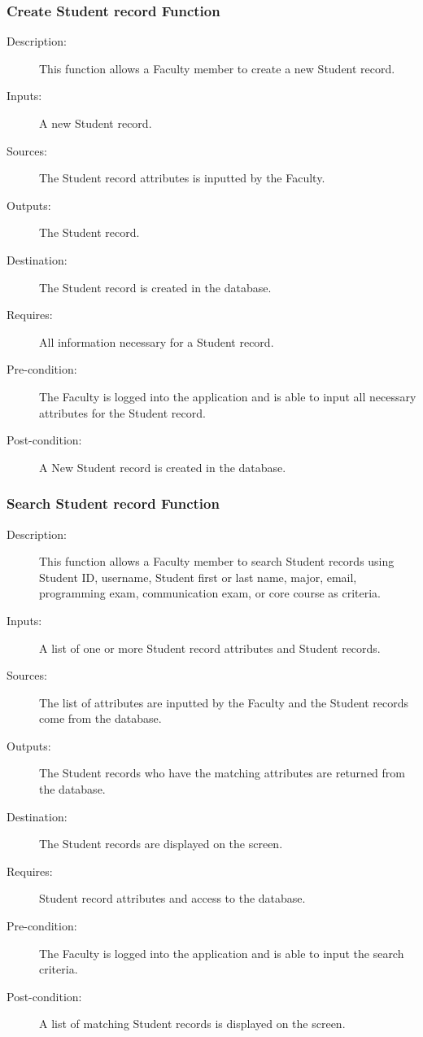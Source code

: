 \subsubsection{\large Create Student record Function} 
\begin{boxed} %
\small\begin{description}
\item[Description:]
   This function allows a Faculty member to create a new Student record.
\item[Inputs:]
   A new Student record.
\item[Sources:]
   The Student record attributes is inputted by the Faculty.
\item[Outputs:]
   The Student record.
\item[Destination:]
   The Student record is created in the database.
\item[Requires:]
   All information necessary for a Student record.
\item[Pre-condition:]
   The Faculty is logged into the application and is able to input all necessary
   attributes for the Student record.
\item[Post-condition:]
   A New Student record is created in the database.
\end{description}
\normalsize
\end{boxed} %

\subsubsection{\large Search Student record Function} 
\begin{boxed} %
\small\begin{description}
\item[Description:]
   This function allows a Faculty member to search Student records using
   Student ID, username, Student first or last name, major, email, programming
   exam, communication exam, or core course as criteria.
\item[Inputs:]
   A list of one or more Student record attributes and Student records.
\item[Sources:]
   The list of attributes are inputted by the Faculty and the Student records
   come from the database.
\item[Outputs:]
   The Student records who have the matching attributes are returned from the
   database.
\item[Destination:]
   The Student records are displayed on the screen.
\item[Requires:]
   Student record attributes and access to the database.
\item[Pre-condition:]
   The Faculty is logged into the application and is able to input the search
   criteria.
\item[Post-condition:]
   A list of matching Student records is displayed on the screen.
\end{description}
\normalsize
\end{boxed} %

